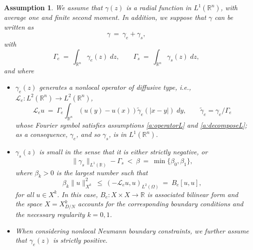 \documentclass[11pt]{amsart}   	%
\theoremstyle{plain}
\numberwithin{equation}{section}
\newtheorem{assumption}[thm]{Assumption}
\def\R{\mathbb{R}}
\newcommand{\JMS}[1]{{\color{orange} {\bf J. Siktar:} [#1] }}
\begin{document}
\begin{assumption}\label{a:gamma}
We assume that $\gamma(z)$ is a radial function in $L^1(\R^n)$, with average one and finite second moment.
In addition, we suppose that $\gamma$ can be written as
\[ \gamma \ = \ \gamma_e + \gamma_s,\]
with 
\[ \Gamma_e  \ = \ \int_{\R^n} \gamma_e(z) \;dz, \qquad  \Gamma_s \ = \ \int_{\R^n} \gamma_s(z) \;dz,  \]
 and where
\begin{itemize}
\item $\gamma_e(z) $ generates a nonlocal operator of diffusive type, i.e., $\mathcal{L}_e: L^2(\R^n) \longrightarrow L^2(\R^n)$,
\[ \mathcal{L}_e u \ = \ \Gamma_e \int_{\R^n} (u(y) -u(x)) \tilde{\gamma}_e(|x-y|) \;dy, \qquad  \tilde{\gamma}_e = \gamma_e/ \Gamma_e \]
whose Fourier symbol satisfies assumptions \ref{a:operatorL} and \ref{a:decomposeL}; as a consequence, $\gamma_e$, and so $\gamma_s$, is in $L^1(\R^n)$.

\item $\gamma_s(z) $ is small in the sense that it is either strictly negative, or 
 $$\|\gamma_s\|_{L^1(\R)} - \Gamma_s \ < \ \beta \ = \ \min\{ \beta_0,\beta_1\},$$
 where $\beta_k>0$ is the largest number such that
\[ \beta_k \| u\|^2_{X^k} \ \leq \ (-\mathcal{L}_e u, u)_{L^2(\Omega)} \ = \ B_e[u,u],\]
for all $u \in X^k$. In this case,  $B_e : X \times X \longrightarrow \R$ is associated bilinear form and the space $X= X^k_{D/N}$  accounts for the corresponding boundary conditions and the necessary regularity $k=0,1$. 

\item When considering nonlocal Neumann boundary constraints, we further assume that $\gamma_e(z) $ is strictly positive.
\end{itemize}


\end{assumption}
\end{document}

